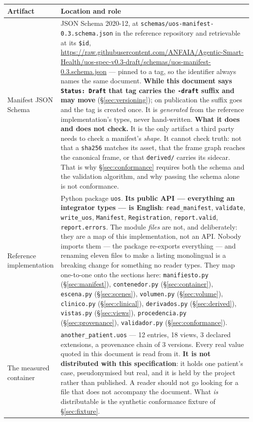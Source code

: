 \documentclass[11pt,a4paper]{article}
\newcommand{\code}[1]{\texttt{\small #1}}
\begin{document}
\begin{longtable}{L{4.6cm} L{10.8cm}}
\toprule
\textbf{Artifact} & \textbf{Location and role}\\
\midrule
\endhead
Manifest JSON Schema & JSON Schema 2020-12, at
\code{schemas/uos-manifest-0.3.schema.json} in the reference repository and retrievable at
its \code{\$id},
\url{https://raw.githubusercontent.com/ANFAIA/Agentic-Smart-Health/uos-spec-v0.3-draft/schemas/uos-manifest-0.3.schema.json}
--- pinned to a tag, so the identifier always names the same document. \textbf{While this
document says \code{Status: Draft} that tag carries the \code{-draft} suffix and may move}
(\S\ref{sec:versioning}); on publication the suffix goes and the tag is created once.  It is
\emph{generated} from the reference implementation's types, never hand-written. \textbf{What it does and does not check.} It is the only artifact a third party needs
to check a manifest's \emph{shape}. It cannot check truth: not that a \code{sha256} matches
its asset, that the frame graph reaches the canonical frame, or that \code{derived/} carries
its sidecar. That is why \S\ref{sec:conformance} requires both the schema and the validation
algorithm, and why passing the schema alone is not conformance.\\
Reference implementation & Python package \code{uos}. \textbf{Its public API --- everything
an integrator types --- is English}: \code{read\_manifest}, \code{validate},
\code{write\_uos}, \code{Manifest}, \code{Registration}, \code{report.valid},
\code{report.errors}. The module \emph{files} are not, and deliberately: they are a map of
this implementation, not an API. Nobody imports them --- the package re-exports everything
--- and renaming eleven files to make a listing monolingual is a breaking change for
something no reader types. They map one-to-one onto the sections here:
\code{manifiesto.py} (\S\ref{sec:manifest}), \code{contenedor.py}
(\S\ref{sec:container}), \code{escena.py} (\S\ref{sec:scenes}), \code{volumen.py}
(\S\ref{sec:volume}), \code{clinico.py} (\S\ref{sec:clinical}), \code{derivados.py}
(\S\ref{sec:derived}), \code{vistas.py} (\S\ref{sec:views}), \code{procedencia.py}
(\S\ref{sec:provenance}), \code{validador.py} (\S\ref{sec:conformance}).\\
The measured container & \code{another\_patient.uos} --- 12 entries, 18 views, 3 declared
extensions, a provenance chain of 3 versions. Every real value quoted in this document is
read from it. \textbf{It is not distributed with this specification}: it holds one
patient's case, pseudonymised but real, and it is held by the project rather than published.
A reader should not go looking for a file that does not accompany the document. What
\emph{is} distributable is the synthetic conformance fixture of \S\ref{sec:fixture}.\\
\bottomrule
\end{longtable}
\end{document}
